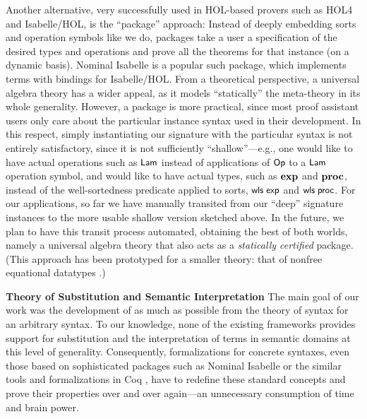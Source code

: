 \documentclass{llncs}
\begin{document}
Another alternative, very successfully used in HOL-based provers such as HOL4 \cite{slind-norrish-2008} and Isabelle/HOL, 
is the ``package'' approach: Instead of deeply embedding sorts and 
operation symbols like we do, packages take a user a specification 
of the desired types and operations and prove all the theorems for that instance (on a dynamic basis).  
Nominal Isabelle \cite{urban-2008,urbanGeneralBinders} is 
a popular such package, which implements terms with bindings for Isabelle/HOL. 
From a theoretical perspective, a universal algebra theory has a wider appeal, as it models 
``statically'' the meta-theory in its whole generality. However, a package 
is more practical, since most proof assistant users only care about the particular instance 
syntax used in their development. 
In this respect, simply instantiating our signature with the particular syntax is 
not entirely satisfactory, since it is not sufficiently ``shallow''---e.g., one would like to have actual operations such as $\mbox{\rm\textsf{\small Lam}}$     
instead of applications of $\mbox{\rm\textsf{\small Op}}$ to a $\mbox{\rm\textsf{\small Lam}}$ operation symbol, 
and would like to have actual types, such as $\mbox{\bf exp}$ and $\mbox{\bf proc}$, instead 
of the well-sortedness predicate applied to sorts, $\mbox{\rm\textsf{\small wls}}\;\mbox{\rm\textsf{\small exp}}$ and $\mbox{\rm\textsf{\small wls}}\;\mbox{\rm\textsf{\small proc}}$. 
%
For our applications, so far we have 
manually transited from our ``deep'' signature instances 
to the more usable shallow version sketched above.  
In the future, we plan to have this transit process automated, obtaining the best of both worlds, 
namely a universal algebra theory that also acts as a {\em statically certified} package. 
(This approach has been prototyped for a %
smaller theory: that of 
nonfree equational datatypes \cite{schropp-nonfree}.)

 



{\bf Theory of Substitution and Semantic Interpretation}  
%
The main goal of our work was the development of 
as much as possible from the theory of syntax 
for an arbitrary syntax. 
To our knowledge, 
none of the existing frameworks provides %
support for substitution 
and the interpretation of terms in semantic domains at this level of generality. 
Consequently, formalizations for concrete syntaxes, even those based on 
sophisticated packages such as Nominal Isabelle or the similar 
tools and formalizations in Coq \cite{nominalCoq,aydemirPOPL08,Hirschowitz:2012}, have to redefine these standard concepts 
and prove their properties over and over again---an unnecessary consumption 
of time and brain power. 
\end{document}
